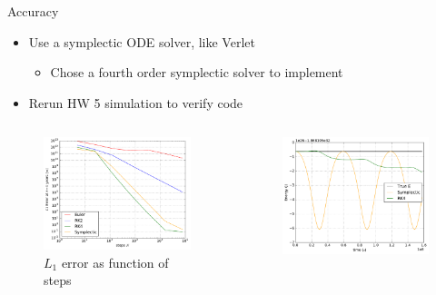\documentclass{beamer}
\theoremstyle{definition}
\begin{document}
\begin{frame}{Accuracy}
  \begin{itemize}
  \item Use a symplectic ODE solver, like Verlet
  \begin{itemize}
  \item Chose a fourth order symplectic solver to implement
  \end{itemize}
  \item Rerun HW 5 simulation to verify code
  \end{itemize}
\begin{columns}[b]
  \begin{column}{.5\textwidth}
        \centering
        \begin{figure}
        \centering
      \includegraphics[width=\textwidth,keepaspectratio]{1_error}
              \caption{$L_1$ error as function of steps}
      \end{figure}
  \end{column}
  \begin{column}{.5\textwidth}
        \centering
        \begin{figure}
        \centering
      \includegraphics[width=\textwidth,keepaspectratio]{1_rk4_energy}

\end{figure}
\end{column}
\end{columns}
\end{frame}
\end{document}
